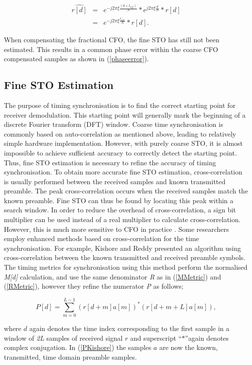 \begin{eqnarray}
\label{phaseerror}
\widehat{r[d]} &=&  e^{-j2\pi\xi \frac{(d+t_{off})}{N}}*e^{j2\pi\xi \frac{d}{N}}*r[d] \nonumber \\
&=& e^{-j2\pi\xi \frac{t_{off}}{N}}*r[d].
\end{eqnarray}

When compensating the fractional CFO, the fine STO has still not been estimated. This results in a common phase error within the coarse CFO compensated samples as shown in (\ref{phaseerror}).

\subsection{Fine STO Estimation}

The purpose of timing synchronisation is to find the correct starting point for receiver demodulation.
This starting point will generally mark the beginning of a discrete Fourier transform (DFT) window.
Coarse time synchronisation is commonly based on auto-correlation as mentioned above, leading to relatively simple hardware implementation.
However, with purely coarse STO, it is almost impossible to achieve sufficient accuracy to correctly detect the starting point.
Thus,  fine STO estimation is necessary to refine the accuracy of timing synchronisation.
To obtain more accurate fine STO estimation, cross-correlation is usually performed between the received samples and known transmitted preamble.
The peak cross-correlation occurs when the received samples match the known preamble.
Fine STO can thus be found by locating this peak within a search window.
In order to reduce the overhead of cross-correlation, a sign bit multiplier can be used instead of a real multiplier to calculate cross-correlation. However, this is much more sensitive to CFO in practice \cite{Schwoerer2002}. Some researchers employ enhanced methods based on cross-correlation for the time synchronisation.
For example, Kishore and Reddy \cite{Kishore2006} presented an algorithm using cross-correlation between the known transmitted and received preamble symbols.
The timing metrics for synchronisation using this method perform the normalised \emph{M[d]} calculation, and use the same denominator \emph{R} as in (\ref{MMetric}) and (\ref{RMetric}), however they refine the numerator \emph{P} as follows;
\begin{center}
\begin{equation}
\label{PKishore}
P[d] =\sum_{m =0}^{L-1}    (r[d+m] a[m])^{*} (r[d+m+L] a[m]),
\end{equation}
\end{center}
where $d$ again denotes the time index corresponding to the first sample in a window of \emph{2L} samples of received signal $r$ and superscript \textquotedblleft$*$\textquotedblright again denotes complex conjugation. In (\ref{PKishore}) the samples $a$ are now the known, transmitted, time domain preamble samples.

